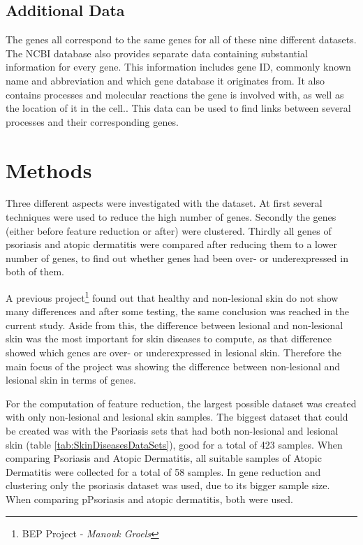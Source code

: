 \documentclass[10pt,a4paper]{article}
\begin{document}
	\subsection{Additional Data}
	\label{subsec:AdditionalData}
	
	The genes all correspond to the same genes for all of these nine different datasets. The NCBI database\cite{edgar2002gene} also provides separate data containing substantial information for every gene. This information includes gene ID, commonly known name and abbreviation and which gene database it originates from. It also contains processes and molecular reactions the gene is involved with, as well as the location of it in the cell.. This data can be used to find links between several processes and their corresponding genes.
	
	\section{Methods}
	\label{sec:Methods}
	
	Three different aspects were investigated with the dataset. At first several techniques were used to reduce the high number of genes. Secondly the genes (either before feature reduction or after) were clustered. Thirdly all genes of psoriasis and atopic dermatitis were compared after reducing them to a lower number of genes, to find out whether genes had been over- or underexpressed in both of them.
	
	A previous project\footnote{BEP Project -\textit{ Manouk Groels}} found out that healthy and non-lesional skin do not show many differences and after some testing, the same conclusion was reached in the current study. Aside from this, the difference between lesional and non-lesional skin was the most important for skin diseases to compute, as that difference showed which genes are over- or underexpressed in lesional skin. Therefore the main focus of the project was showing the difference between non-lesional and lesional skin in terms of genes. 
	
	For the computation of feature reduction, the largest possible dataset was created with only non-lesional and lesional skin samples. The biggest dataset that could be created was with the Psoriasis sets that had both non-lesional and lesional skin (table \ref{tab:SkinDiseasesDataSets}), good for a total of 423 samples. When comparing Psoriasis and Atopic Dermatitis, all suitable samples of Atopic Dermatitis were collected for a total of 58 samples. In gene reduction and clustering only the psoriasis dataset was used, due to its bigger sample size. When comparing pPsoriasis and atopic dermatitis, both were used.
	
\end{document}
